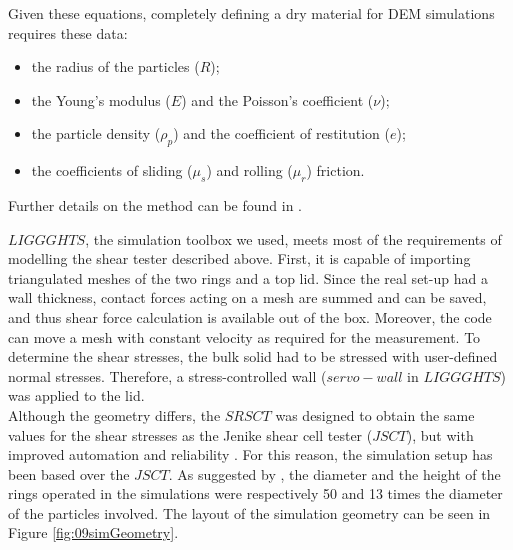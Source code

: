Given these equations, completely defining a dry material for DEM simulations requires these data:
\begin{itemize}
\item{the radius of the particles ($R$);}
\item{the Young's modulus ($E$) and the Poisson's coefficient ($\nu$);}
\item{the particle density ($\rho_p$) and the coefficient of restitution ($e$);}
\item{the coefficients of sliding ($\mu_s$) and rolling ($\mu_r$) friction.}
\end{itemize}


Further details on the method can be found in \cite{RefWorks:133}.


$LIGGGHTS$, the simulation toolbox we used, meets most of the requirements of modelling the shear tester described above. 
First, it is capable of importing triangulated meshes of the two rings and a top lid. Since the real set-up had a wall thickness, 
contact forces acting on a mesh are summed and can be saved, and thus shear force calculation is available out of the box. Moreover, 
the code can move a mesh with constant velocity as required for the measurement. 
To determine the shear stresses, the bulk solid had to be stressed with user-defined normal stresses.
Therefore, a stress-controlled wall ($servo-wall$ in $LIGGGHTS$) was applied to the lid. \\

Although the geometry differs, the $SRSCT$ was designed to obtain the same
values for the shear stresses as the Jenike shear cell tester ($JSCT$), but with
improved automation and reliability \cite{RefWorks:118}.
For this reason, the simulation setup has been based over the $JSCT$.
As suggested by \cite{RefWorks:139}, the diameter and the height of the rings operated in the simulations were respectively 50 and 13 times the diameter of the particles involved.
The layout of the simulation geometry can be seen in Figure \ref{fig:09simGeometry}. \\
 

